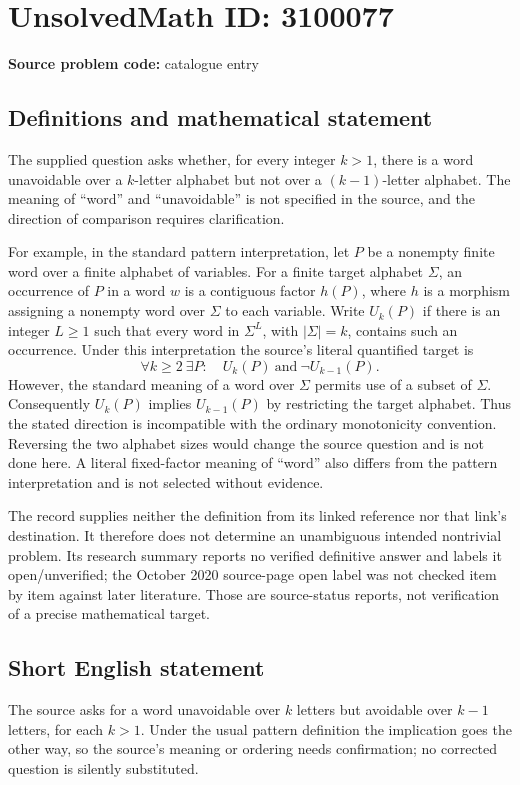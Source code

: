 \documentclass[11pt]{article}
\begin{document}
\section*{UnsolvedMath ID: 3100077}
\textbf{Source problem code:} catalogue entry
\subsection{Definitions and mathematical statement}
The supplied question asks whether, for every integer \(k>1\), there is a word unavoidable over a \(k\)-letter alphabet but not over a \((k-1)\)-letter alphabet. The meaning of ``word'' and ``unavoidable'' is not specified in the source, and the direction of comparison requires clarification.

For example, in the standard pattern interpretation, let \(P\) be a nonempty finite word over a finite alphabet of variables. For a finite target alphabet \(\Sigma\), an occurrence of \(P\) in a word \(w\) is a contiguous factor \(h(P)\), where \(h\) is a morphism assigning a nonempty word over \(\Sigma\) to each variable. Write \(U_k(P)\) if there is an integer \(L\ge1\) such that every word in \(\Sigma^L\), with \(|\Sigma|=k\), contains such an occurrence. Under this interpretation the source's literal quantified target is
\[
 \forall k\ge2\ \exists P:\quad U_k(P)\ \text{and}\ \neg U_{k-1}(P).
\]
However, the standard meaning of a word over \(\Sigma\) permits use of a subset of \(\Sigma\). Consequently \(U_k(P)\) implies \(U_{k-1}(P)\) by restricting the target alphabet. Thus the stated direction is incompatible with the ordinary monotonicity convention. Reversing the two alphabet sizes would change the source question and is not done here. A literal fixed-factor meaning of ``word'' also differs from the pattern interpretation and is not selected without evidence.

The record supplies neither the definition from its linked reference nor that link's destination. It therefore does not determine an unambiguous intended nontrivial problem. Its research summary reports no verified definitive answer and labels it open/unverified; the October 2020 source-page open label was not checked item by item against later literature. Those are source-status reports, not verification of a precise mathematical target.
\subsection{Short English statement}
The source asks for a word unavoidable over \(k\) letters but avoidable over \(k-1\) letters, for each \(k>1\). Under the usual pattern definition the implication goes the other way, so the source's meaning or ordering needs confirmation; no corrected question is silently substituted.
\end{document}
